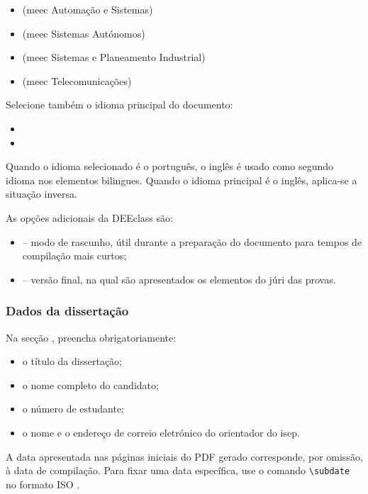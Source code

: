 \begin{itemize}
\item {} (\acs{meec} Automação e Sistemas)
\item {} (\acs{meec} Sistemas Autónomos)
\item {} (\acs{meec} Sistemas e Planeamento Industrial)
\item {} (\acs{meec} Telecomunicações)
\end{itemize}

Selecione também o idioma principal do documento: 
\begin{itemize}
\item {} 
\item {}
\end{itemize}

Quando o idioma selecionado é o português, o inglês é usado como segundo idioma nos elementos bilingues. Quando o idioma principal é o inglês, aplica-se a situação inversa.

As opções adicionais da DEEclass são:

\begin{itemize}
    \item {} -- modo de rascunho, útil durante a preparação do documento para tempos de compilação mais curtos;
    \item {} -- versão final, na qual são apresentados os elementos do júri das provas.
\end{itemize}

\subsubsection*{Dados da dissertação}

Na secção , preencha obrigatoriamente:

\begin{itemize}
\item o título da dissertação;
\item o nome completo do candidato;
\item o número de estudante;
\item o nome e o endereço de correio eletrónico do orientador do \ac{isep}.
\end{itemize}

A data apresentada nas páginas iniciais do PDF gerado corresponde, por omissão, à data de compilação. Para fixar uma data específica, use o comando \verb|\subdate| no formato ISO .

